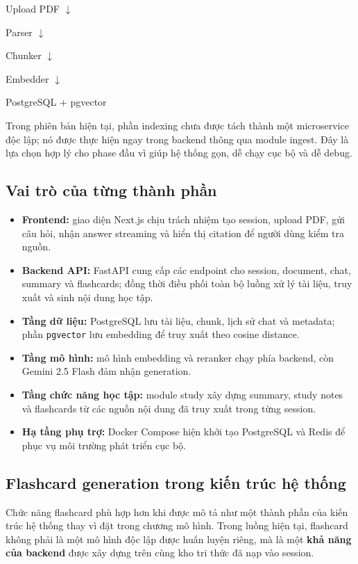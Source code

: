 \documentclass[12pt]{ai_conquer2026}
\begin{document}
\begin{aivnoutputbox}
Upload PDF
$\downarrow$

Parser
$\downarrow$

Chunker
$\downarrow$

Embedder
$\downarrow$

PostgreSQL + pgvector
\end{aivnoutputbox}

Trong phiên bản hiện tại, phần indexing chưa được tách thành một microservice độc lập; nó được thực hiện ngay trong backend thông qua module ingest. Đây là lựa chọn hợp lý cho phase đầu vì giúp hệ thống gọn, dễ chạy cục bộ và dễ debug.

\subsection{Vai trò của từng thành phần}

\begin{itemize}
    \item \textbf{Frontend:} giao diện Next.js chịu trách nhiệm tạo session, upload PDF, gửi câu hỏi, nhận answer streaming và hiển thị citation để người dùng kiểm tra nguồn.
    \item \textbf{Backend API:} FastAPI cung cấp các endpoint cho session, document, chat, summary và flashcards; đồng thời điều phối toàn bộ luồng xử lý tài liệu, truy xuất và sinh nội dung học tập.
    \item \textbf{Tầng dữ liệu:} PostgreSQL lưu tài liệu, chunk, lịch sử chat và metadata; phần \texttt{pgvector} lưu embedding để truy xuất theo cosine distance.
    \item \textbf{Tầng mô hình:} mô hình embedding và reranker chạy phía backend, còn Gemini 2.5 Flash đảm nhận generation.
    \item \textbf{Tầng chức năng học tập:} module study xây dựng summary, study notes và flashcards từ các nguồn nội dung đã truy xuất trong từng session.
    \item \textbf{Hạ tầng phụ trợ:} Docker Compose hiện khởi tạo PostgreSQL và Redis để phục vụ môi trường phát triển cục bộ.
\end{itemize}

\subsection{Flashcard generation trong kiến trúc hệ thống}

Chức năng flashcard phù hợp hơn khi được mô tả như một thành phần của kiến trúc hệ thống thay vì đặt trong chương mô hình. Trong luồng hiện tại, flashcard không phải là một mô hình độc lập được huấn luyện riêng, mà là một \textbf{khả năng của backend} được xây dựng trên cùng kho tri thức đã nạp vào session.
\end{document}

